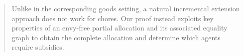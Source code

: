 \documentclass[11pt]{article}
\theoremstyle{plain}
\theoremstyle{plain}
\begin{document}
\begin{abstract}
Unlike in the corresponding goods setting, a natural incremental extension approach does not work for chores. Our proof instead exploits key properties of an envy-free partial allocation and its associated equality graph to obtain the complete allocation and determine which agents require subsidies.
\end{abstract}

\end{document}
